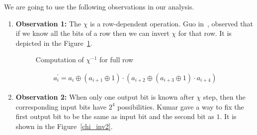 We are going to use the following observations in our analysis.
\begin{enumerate}
\item \label{ob1}\textbf{Observation 1:} The $\chi$ is a row-dependent operation. Guo \etal in~\cite{guo2016linear}, observed that if we know all the bits of a row then we can invert $\chi$ for that row. It is depicted in the Figure~\ref{chi_inv}.
\begin{figure}
\begin{center}
\end{center}
\caption{Computation of $\chi^{-1}$ for full row \label{chi_inv}}
\end{figure}
\begin{align}
a_i^\prime = a_i \oplus \left( a_{i+1} \oplus 1\right) \cdot \left( a_{i+2} \oplus \left( a_{i+3} \oplus 1 \right) \cdot a_{i+4}\right)
\end{align}


\item \label{ob2}\textbf{Observation 2:} When only one output bit is known after $\chi$ step, then the corresponding input bits have $2^4$ possibilities. Kumar \etal\cite{kumar2018cryptanalysis} gave a way to fix the first output bit to be the same as input bit and the second bit as $1$. It is shown in the Figure~\ref{chi_inv2}.

\begin{figure}[ht]
\begin{center}
\end{center}
\end{figure}
\end{enumerate}
